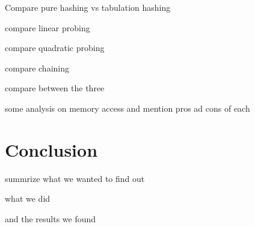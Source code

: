 \documentclass[12pt]{article}
\begin{document}
Compare pure hashing vs tabulation hashing

compare linear probing

compare quadratic probing

compare chaining

compare between the three

some analysis on memory access  and mention pros ad cons of each


\section{Conclusion}
summrize what we wanted to find out

what we did

and the results we found



\end{document}
